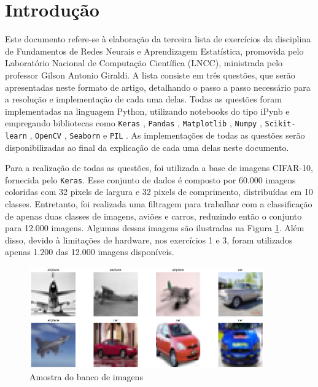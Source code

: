 \documentclass[]{abntex2}
\begin{document}
\frenchspacing 

\maketitle

\section*{\textbf{Introdução}}

Este documento refere-se à elaboração da terceira lista de exercícios da disciplina de Fundamentos de Redes Neurais e Aprendizagem Estatística, promovida pelo Laboratório Nacional de Computação Científica (LNCC), ministrada pelo professor Gilson Antonio Giraldi. A lista consiste em três questões, que serão apresentadas neste formato de artigo, detalhando o passo a passo necessário para a resolução e implementação de cada uma delas. Todas as questões foram implementadas na linguagem Python, utilizando notebooks do tipo iPynb e empregando bibliotecas como \texttt{Keras} \cite{keras}, \texttt{Pandas} \cite{pandas}, \texttt{Matplotlib} \cite{matplotlib}, \texttt{Numpy} \cite{numpy}, \texttt{Scikit-learn} \cite{scikit-learn}, \texttt{OpenCV} \cite{opencv}, \texttt{Seaborn} \cite{seaborn} e \texttt{PIL} \cite{pillow}. As implementações de todas as questões serão disponibilizadas ao final da explicação de cada uma delas neste documento.

Para a realização de todas as questões, foi utilizada a base de imagens CIFAR-10, fornecida pelo \texttt{Keras}. Esse conjunto de dados é composto por 60.000 imagens coloridas com 32 pixels de largura e 32 pixels de comprimento, distribuídas em 10 classes. Entretanto, foi realizada uma filtragem para trabalhar com a classificação de apenas duas classes de imagens, aviões e carros, reduzindo então o conjunto para 12.000 imagens. Algumas dessas imagens são ilustradas na Figura \ref{fig:amostra}. Além disso, devido à limitações de hardware, nos exercícios 1 e 3, foram utilizados apenas 1.200 das 12.000 imagens disponíveis.

\begin{figure}[H]
    \centering 
    \includegraphics[width=0.9\textwidth]{imgs/introduction/amostra.png}
    \caption{Amostra do banco de imagens}
    \label{fig:amostra} %
\end{figure}
\end{document}
